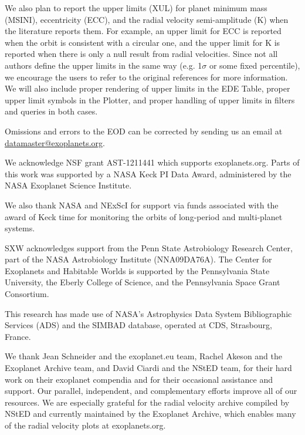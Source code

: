 \documentclass[11pt,preprint]{aastex}
\begin{document}
\begin{CJK*}{UTF8}{gbsn}
We also plan to report the upper limits (XUL) for planet minimum mass (MSINI),
eccentricity (ECC), and the radial velocity semi-amplitude (K) when
the literature reports them. For example, an upper limit for ECC is
reported when the orbit is consistent with a circular one, and the
upper limit for K is reported when there is only a null result from
radial velocities. Since not all authors define the upper limits in the same
way (e.g. 1$\sigma$ or some fixed percentile), we encourage the
users to refer to the original references for more information. We
will also include proper rendering of upper limits in the EDE Table,
proper upper limit symbols in the Plotter, and proper handling of
upper limits in filters and queries in both cases. 
 
Omissions and errors to the EOD can be corrected by sending us an
email at \url{datamaster@exoplanets.org}.


\acknowledgments

We acknowledge NSF grant AST-1211441 which supports exoplanets.org.
Parts of this work was supported by a NASA Keck PI Data Award, administered by
the NASA Exoplanet Science Institute.

We also thank NASA and NExScI for support via funds associated with
the award of Keck time for monitoring the orbits of long-period and
multi-planet systems.

SXW acknowledges support from the Penn State Astrobiology Research
Center, part of the NASA Astrobiology Institute (NNA09DA76A). The Center for
Exoplanets and Habitable Worlds is supported by the 
Pennsylvania State University, the Eberly College of Science, and the
Pennsylvania Space Grant Consortium.

This research has made use of
NASA's Astrophysics Data System Bibliographic Services (ADS) and the SIMBAD database,
operated at CDS, Strasbourg, France. 

We thank Jean Schneider and the exoplanet.eu team, Rachel Akeson
and the Exoplanet Archive team, and David Ciardi and the NStED team,
for their hard work on their exoplanet compendia and for their
occasional assistance and support.  Our parallel,
independent, and complementary efforts improve all of our resources.
We are especially grateful for the radial velocity archive compiled by
NStED and currently maintained by the Exoplanet Archive, which enables
many of the radial velocity plots at exoplanets.org.


\end{CJK*}
\end{document}
